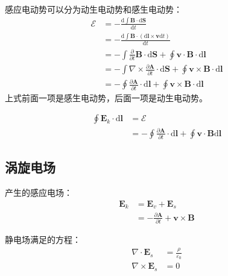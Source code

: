 \documentclass[12pt,onecolumn,a4paper]{book}
\numberwithin{table}{subsection}
\numberwithin{equation}{subsection}
\begin{document}
    感应电动势可以分为动生电动势和感生电动势：
    \begin{align}
        \mathcal{E} & = - \frac{\mathrm{d} \int \mathbf{B} \cdot \mathrm{d} \mathbf{S}}{\mathrm{d} t}                                                                           \\
                    & = - \frac{\mathrm{d} \int \mathbf{B} \cdot (\mathrm{d} \mathbf{l} \times \mathbf{v}\mathrm{d} t )}{\mathrm{d} t}                                          \\
                    & = - \int \frac{\partial}{\partial t}\mathbf{B} \cdot \mathrm{d} \mathbf{S}  + \oint \mathbf{v} \cdot \mathbf{B} \cdot\mathrm{d} \mathbf{l}                \\
                    & = - \int \nabla \times \frac{\partial\mathbf{A}}{\partial t} \cdot \mathrm{d} \mathbf{S}  + \oint \mathbf{v} \times \mathbf{B} \cdot\mathrm{d} \mathbf{l} \\
                    & = - \oint \frac{\partial\mathbf{A}}{\partial t} \cdot \mathrm{d} \mathbf{l}  + \oint \mathbf{v} \times \mathbf{B} \cdot\mathrm{d} \mathbf{l}
    \end{align}
    上式前面一项是感生电动势，后面一项是动生电动势。

    \begin{align}
        \oint  \mathbf{E}_k \cdot\mathrm{d} \mathbf{l} & = \mathcal{E}                                                                                                                          \\
                                                       & = - \oint \frac{\partial\mathbf{A}}{\partial t} \cdot \mathrm{d} \mathbf{l}  + \oint \mathbf{v} \cdot \mathbf{B} \mathrm{d} \mathbf{l}
    \end{align}

    \subsection{涡旋电场}

    产生的感应电场：
    \begin{align}
        \mathbf{E}_k & =\mathbf{E}_v+ \mathbf{E}_s                                              \\
                     & = - \frac{\partial\mathbf{A}}{\partial t} + \mathbf{v} \times \mathbf{B}
    \end{align}

    静电场满足的方程：
    \begin{align}
        \nabla \cdot \mathbf{E}_s  & = \frac{\rho}{\varepsilon_0} \\
        \nabla \times \mathbf{E}_s & = 0
    \end{align}
\end{document}
